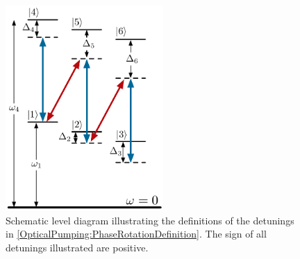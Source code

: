 \begin{figure}
    \centering
    \includegraphics[width=6cm]{PhaseRotationDefinition}
    \caption{Schematic level diagram illustrating the definitions of the detunings in \eqref{OpticalPumping:PhaseRotationDefinition}. The sign of all detunings illustrated are positive.}
    \label{OpticalPumping:PhaseRotationDefinition}
\end{figure}

